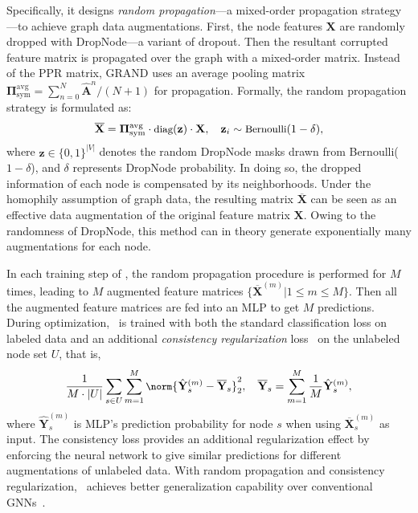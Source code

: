 Specifically, it designs 
\textit{random propagation}---a mixed-order propagation strategy---to achieve graph data augmentations. 
First, the node features $\mathbf{X}$ are  randomly dropped with DropNode---a variant of dropout. 
Then the resultant corrupted feature matrix is propagated over the graph with a mixed-order matrix. 
Instead of the PPR matrix, GRAND uses an average pooling matrix $\mathbf{\Pi}^{\text{avg}}_{\text{sym}} = \sum_{n=0}^{N} \hat{\mathbf{A}}^n/(N+1)$ for propagation.
Formally, the random propagation strategy is formulated as: 
\begin{equation}
\small
\label{equ:randprop}
    \overline{\mathbf{X}} = \mathbf{\Pi}^{\text{avg}}_{\text{sym}} \cdot \text{diag}(\mathbf{z}) \cdot \mathbf{X}, \quad \mathbf{z}_i \sim \text{Bernoulli}(1 - \delta),
\end{equation}
where $\mathbf{z} \in \{0,1\}^{|V|}$ denotes the random DropNode masks drawn from Bernoulli($1 - \delta$), and $\delta$ represents DropNode probability. 
In doing so, the dropped information of each node is compensated by its neighborhoods. 
Under the homophily assumption of graph data, the resulting matrix $\overline{\mathbf{X}}$ can be seen as an effective data augmentation of the original feature matrix $\mathbf{X}$. 
Owing to the randomness of DropNode, this method can in theory generate exponentially many augmentations for each node. 


In each training step of \grand, the random propagation procedure is performed for $M$ times, leading to $M$ augmented feature matrices $\{\overline{\mathbf{X}}^{(m)}|1\leq m \leq M\}$. 
Then all the augmented feature matrices are fed into an MLP to get $M$ predictions. 
During optimization, \grand\ is trained with both the standard classification loss on labeled data and an additional \textit{consistency regularization} loss~\cite{berthelot2019mixmatch} on the unlabeled node set $U$, that is, 
\begin{equation}
\label{equ:grand_consis}
\small
    \frac{1}{M\cdot|U|}\sum_{s\in U}\sum_{m=1}^M \norm{\hat{\mathbf{Y}}_s^{(m)} - \overline{\mathbf{Y}}_s}_2^2, \quad \overline{\mathbf{Y}}_s = \sum_{m=1}^M\frac{1}{M}\hat{\mathbf{Y}}_s^{(m)},\end{equation}
where $\hat{\mathbf{Y}}_s^{(m)}$ is MLP's prediction probability for node $s$ when using $\overline{\mathbf{X}}^{(m)}_s$ as input. 
The consistency loss provides an additional regularization effect by enforcing the neural network to give similar predictions for different augmentations of unlabeled data.
With random propagation and consistency regularization, \grand\ achieves better generalization capability over conventional GNNs~\cite{feng2020grand}.




